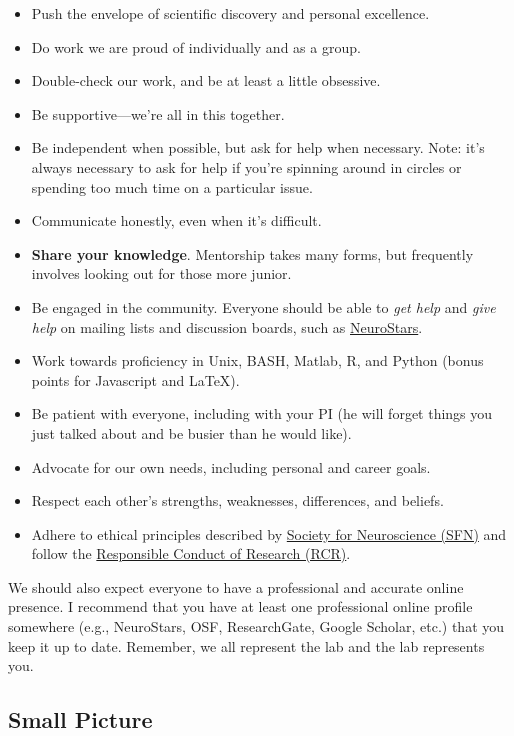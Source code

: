 \documentclass[letterpaper,11pt,oneside]{memoir}
\begin{document}
\begin{itemize}
\item Push the envelope of scientific discovery and personal excellence. 
\item Do work we are proud of individually and as a group.
\item Double-check our work, and be at least a little obsessive.
\item Be supportive---we're all in this together.
\item Be independent when possible, but ask for help when necessary. Note: it's always necessary to ask for help if you're spinning around in circles or spending too much time on a particular issue. 
\item Communicate honestly, even when it's difficult.
\item \textbf{Share your knowledge}. Mentorship takes many forms, but frequently involves looking out for those more junior.
\item Be engaged in the community. Everyone should be able to \textit{get help} and \textit{give help} on mailing lists and discussion boards, such as \href{https://neurostars.org}{NeuroStars}.
\item Work towards proficiency in Unix, BASH, Matlab, R, and Python (bonus points for Javascript and \LaTeX).
\item Be patient with everyone, including with your PI (he will forget things you just talked about and be busier than he would like).
\item Advocate for our own needs, including personal and career goals.
\item Respect each other's strengths, weaknesses, differences, and beliefs.
\item Adhere to ethical principles described by \href{https://www.sfn.org/about/professional-conduct/sfn-ethics-policy}{Society for Neuroscience (SFN)} and follow the \href{https://ori.hhs.gov/ori-introduction-responsible-conduct-research}{Responsible Conduct of Research (RCR)}. 
\end{itemize}

We should also expect everyone to have a professional and accurate online presence. I recommend that you have at least one professional online profile somewhere (e.g., NeuroStars, OSF, ResearchGate, Google Scholar, etc.) that you keep it up to date. Remember, we all represent the lab and the lab represents you.


\subsection{Small Picture}
\end{document}
